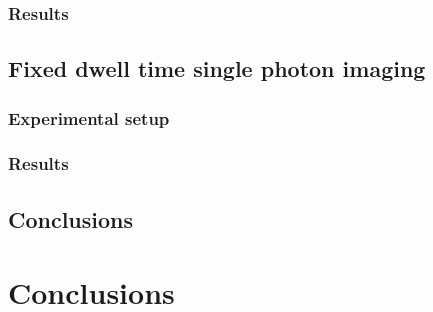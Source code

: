 \documentclass{report}
\begin{document}
\subsection{Results}

\section{Fixed dwell time single photon imaging}

\subsection{Experimental setup}

\subsection{Results}

\section{Conclusions}

\chapter{Conclusions}
\end{document}

